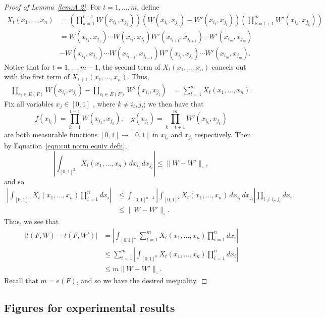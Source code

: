 \begin{proof}[Proof of Lemma~\ref{lem:A.2}]
For $t=1,\ldots,m$, define
\begin{align*}
    X_t(x_1,\ldots,x_n)&=\left(\prod_{k=1}^{t-1}W(x_{i_k},x_{j_k})\right)(W(x_{i_t},x_{j_t})-W'(x_{i_t},x_{j_t}))\left(\prod_{k=t+1}^m W'(x_{i_k},x_{j_k})\right)\\
    &=W(x_{i_1},x_{j_1})\cdots W(x_{i_t},x_{j_t})W'(x_{i_{t+1}},x_{j_{t+1}})\cdots W'(x_{i_m},x_{j_m})\\
    &-W(x_{i_1},x_{j_1})\cdots W(x_{i_{t-1}},x_{j_{t-1}})W'(x_{i_{t}},x_{j_{t}})\cdots W'(x_{i_m},x_{j_m}).
\end{align*}
Notice that for $t=1,\ldots,m-1$, the second term of $X_t(x_1,\ldots,x_n)$ cancels out with the first term of $X_{t+1}(x_1,\ldots,x_n)$. Thus,
\begin{align*}
\prod_{e_t\in E(F)}W(x_{i_t},x_{j_t})-\prod_{e_t\in E(F)}W'(x_{i_t},x_{j_t})&=\sum_{t=1}^{m}X_t(x_1,\ldots,x_n).
\end{align*}
Fix all variables $x_j\in [0,1]$ , where $k\neq i_t,j_t$; we then have that
\[f(x_{i_t})=\prod_{k=1}^{t-1}W(x_{i_k},x_{j_k}),\quad g(x_{j_t})=\prod_{k=t+1}^m W'(x_{i_k},x_{j_k})\]
are both measurable functions $[0,1]\to [0,1]$ in $x_{i_t}$ and $x_{j_t}$ respectively. Then by Equation~\ref{eqn:cut norm equiv defn},
\[\left|\int_{[0,1]^2}X_t(x_1,\ldots,x_n)\,dx_{i_t}\,dx_{j_t}\right|\leq\lVert W-W'\rVert_\square,\]
and so
\begin{align*}
    \left|\int_{[0,1]^n}X_t(x_1,\ldots,x_n)\prod_{i=1}^n dx_i\right|&\leq \int_{[0,1]^{n-2}}\left|\int_{[0,1]^2}X_t(x_1,\ldots,x_n)\,dx_{i_t}\,dx_{j_t}\right|\prod_{i\neq i_t,j_t}dx_i\\
    &\leq\lVert W-W'\rVert_\square.
\end{align*}
Thus, we see that
\begin{align*}
    |t(F,W)-t(F,W')|&=\left|\int_{[0,1]^n}\sum_{t=1}^m X_t(x_1,\ldots,x_n)\prod_{i=1}^n dx_i\right|\\
    &\leq \sum_{t=1}^m\left|\int_{[0,1]^n}X_t(x_1,\ldots,x_n)\prod_{i=1}^n dx_i\right|\\
    &\leq m\lVert W-W'\rVert_\square.
\end{align*}
Recall that $m=e(F)$, and so we have the desired inequality.
\end{proof}

\subsection{Figures for experimental results}\label{appendix:loss figures}

